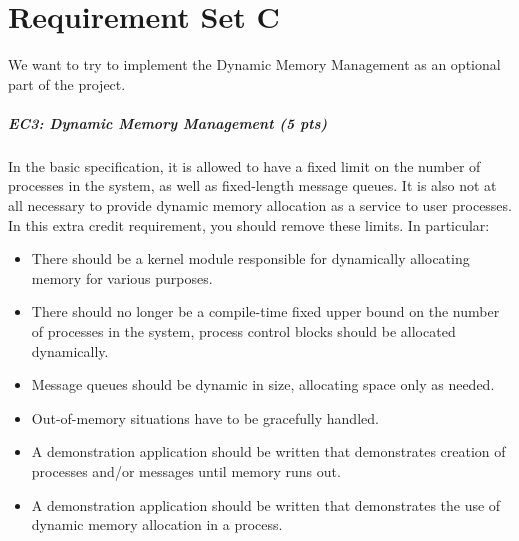 \chapter{Requirement Set C}

We want to try to implement the Dynamic Memory Management as an optional part of the project.

\paragraph*{EC3: Dynamic Memory Management (5 pts)}

In the basic specification, it is allowed to have a fixed limit on the number of processes in the system, as well as fixed-length message queues. It is also not at all necessary to provide dynamic memory allocation as a service to user processes. In this extra credit requirement, you should remove these limits. In particular:

\begin{itemize}
  \item There should be a kernel module responsible for dynamically allocating memory for various purposes.
  \item  There should no longer be a compile-time fixed upper bound on the number of processes in the system, process control blocks should be allocated dynamically.
  \item  Message queues should be dynamic in size, allocating space only as needed.
  \item  Out-of-memory situations have to be gracefully handled.
  \item  A demonstration application should be written that demonstrates creation of processes and/or messages until memory runs out.
  \item  A demonstration application should be written that demonstrates the use of dynamic memory allocation in a process.
\end{itemize}
